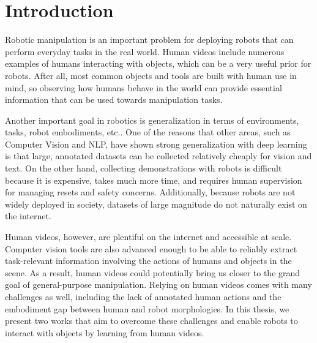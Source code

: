 \chapter{Introduction}

Robotic manipulation is an important problem for deploying robots that can perform everyday tasks in the real world. Human videos include numerous examples of humans interacting with objects, which can be a very useful prior for robots. After all, most common objects and tools are built with human use in mind, so observing how humans behave in the world can provide essential information that can be used towards manipulation tasks.

Another important goal in robotics is generalization in terms of environments, tasks, robot embodiments, etc.. One of the reasons that other areas, such as Computer Vision and NLP, have shown strong generalization with deep learning is that large, annotated datasets can be collected relatively cheaply for vision and text. On the other hand, collecting demonstrations with robots is difficult because it is expensive, takes much more time, and requires human supervision for managing resets and safety concerns. Additionally, because robots are not widely deployed in society, datasets of large magnitude do not naturally exist on the internet.

Human videos, however, are plentiful on the internet and accessible at scale. Computer vision tools are also advanced enough to be able to reliably extract task-relevant information involving the actions of humans and objects in the scene. As a result, human videos could potentially bring us closer to the grand goal of general-purpose manipulation. Relying on human videos comes with many challenges as well, including the lack of annotated human actions and the embodiment gap between human and robot morphologies. In this thesis, we present two works that aim to overcome these challenges and enable robots to interact with objects by learning from human videos.

